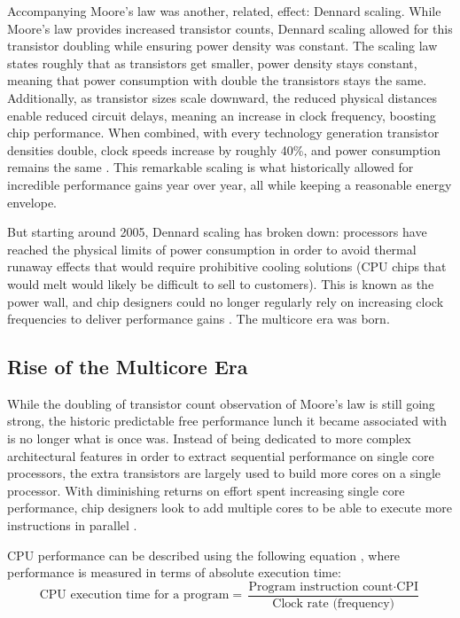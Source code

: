 \documentclass[bsc,frontabs,singlespacing,parskip,deptreport,normalheadings]{infthesis}
\begin{document}
Accompanying Moore's law was another, related, effect: Dennard scaling. While
Moore's law provides increased transistor counts, Dennard scaling allowed for
this transistor doubling while ensuring power density was constant. The scaling
law states roughly that as transistors get smaller, power density stays
constant, meaning that power consumption with double the transistors stays the
same. Additionally, as transistor sizes scale downward, the reduced physical
distances enable reduced circuit delays, meaning an increase in clock frequency,
boosting chip performance. When combined, with every technology generation
transistor densities double, clock speeds increase by roughly 40\%, and power
consumption remains the same \cite{borkar_future_2011}. This remarkable scaling
is what historically allowed for incredible performance gains year over year,
all while keeping a reasonable energy envelope.

But starting around 2005, Dennard scaling has broken down: processors have
reached the physical limits of power consumption in order to avoid thermal
runaway effects that would require prohibitive cooling solutions (CPU chips that
would melt would likely be difficult to sell to customers). This is known as the
power wall, and chip designers could no longer regularly rely on increasing
clock frequencies to deliver performance gains \cite{parkhurst_single_2006}. The
multicore era was born.

\subsection{Rise of the Multicore Era}

While the doubling of transistor count observation of Moore's law is still going
strong, the historic predictable free performance lunch it became associated
with is no longer what is once was. Instead of being dedicated to more complex
architectural features in order to extract sequential performance on single core
processors, the extra transistors are largely used to build more cores on a
single processor. With diminishing returns on effort spent increasing single
core performance, chip designers look to add multiple cores to be able to
execute more instructions in parallel \cite{patterson_trouble_2010}.

CPU performance can be described using the following equation
\cite{patterson_computer_2021}, where performance is measured in terms of
absolute execution time: \[ \text{CPU execution time for a program} =
\frac{\text{Program instruction count} \cdot \text{CPI}}{\text{Clock rate
(frequency)}} \]
\end{document}

